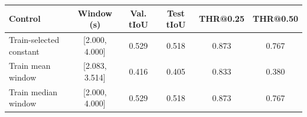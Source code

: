\begin{tabular}{lccccc}
\toprule
Control & Window (s) & Val. tIoU & Test tIoU & THR@0.25 & THR@0.50 \\
\midrule
Train-selected constant & [2.000, 4.000] & 0.529 & 0.518 & 0.873 & 0.767 \\
Train mean window & [2.083, 3.514] & 0.416 & 0.405 & 0.833 & 0.380 \\
Train median window & [2.000, 4.000] & 0.529 & 0.518 & 0.873 & 0.767 \\
\bottomrule
\end{tabular}
